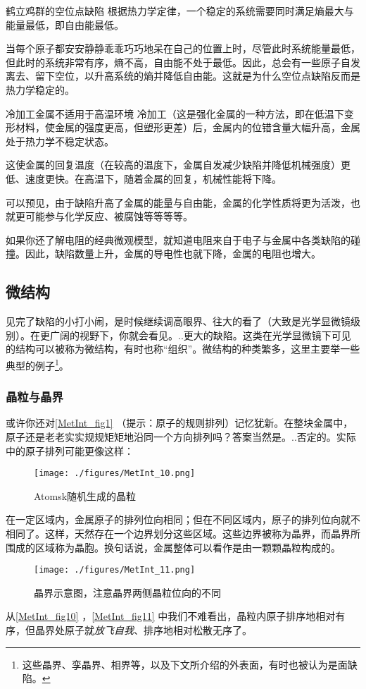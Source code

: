 \begin{example}{鹤立鸡群的空位点缺陷}
根据热力学定律，一个稳定的系统需要同时满足熵最大与能量最低，即自由能最低。

当每个原子都安安静静乖乖巧巧地呆在自己的位置上时，尽管此时系统能量最低，但此时的系统非常有序，熵不高，自由能不处于最低。因此，总会有一些原子自发离去、留下空位，以升高系统的熵并降低自由能。这就是为什么空位点缺陷反而是热力学稳定的。
\end{example}

\begin{example}{冷加工金属不适用于高温环境}
冷加工（这是强化金属的一种方法，即在低温下变形材料，使金属的强度更高，但塑形更差）后，金属内的位错含量大幅升高，金属处于热力学不稳定状态。

这使金属的回复温度（在较高的温度下，金属自发减少缺陷并降低机械强度）更低、速度更快。在高温下，随着金属的回复，机械性能将下降。
\end{example}

可以预见，由于缺陷升高了金属的能量与自由能，金属的化学性质将更为活泼，也就更可能参与化学反应、被腐蚀等等等等。

如果你还了解电阻的经典微观模型，就知道电阻来自于电子与金属中各类缺陷的碰撞。因此，缺陷数量上升，金属的导电性也就下降，金属的电阻也增大。

\subsection{微结构}
见完了缺陷的小打小闹，是时候继续调高眼界、往大的看了（大致是光学显微镜级别）。在更广阔的视野下，你就会看见。..更大的缺陷。这类在光学显微镜下可见的结构可以被称为微结构，有时也称“组织”。微结构的种类繁多，这里主要举一些典型的例子\footnote{这些晶界、孪晶界、相界等，以及下文所介绍的外表面，有时也被认为是面缺陷。}。

\subsubsection{晶粒与晶界}
或许你还对\autoref{MetInt_fig1} （提示：原子的规则排列）记忆犹新。在整块金属中，原子还是老老实实规规矩矩地沿同一个方向排列吗？答案当然是。..否定的。实际中的原子排列可能更像这样：
\begin{figure}[ht]
\centering
\texttt{[image: ./figures/MetInt\_10.png]}
\caption{Atomsk随机生成的晶粒} \label{MetInt_fig10}
\end{figure}
在一定区域内，金属原子的排列位向相同；但在不同区域内，原子的排列位向就不相同了。这样，天然存在一个边界划分这些区域。这些边界被称为晶界，而晶界所围成的区域称为晶胞。换句话说，金属整体可以看作是由一颗颗晶粒构成的。
\begin{figure}[ht]
\centering
\texttt{[image: ./figures/MetInt\_11.png]}
\caption{晶界示意图，注意晶界两侧晶粒位向的不同} \label{MetInt_fig11}
\end{figure}
从\autoref{MetInt_fig10} ，\autoref{MetInt_fig11} 中我们不难看出，晶粒内原子排序地相对有序，但晶界处原子就\textsl{放飞自我}、排序地相对松散无序了。


